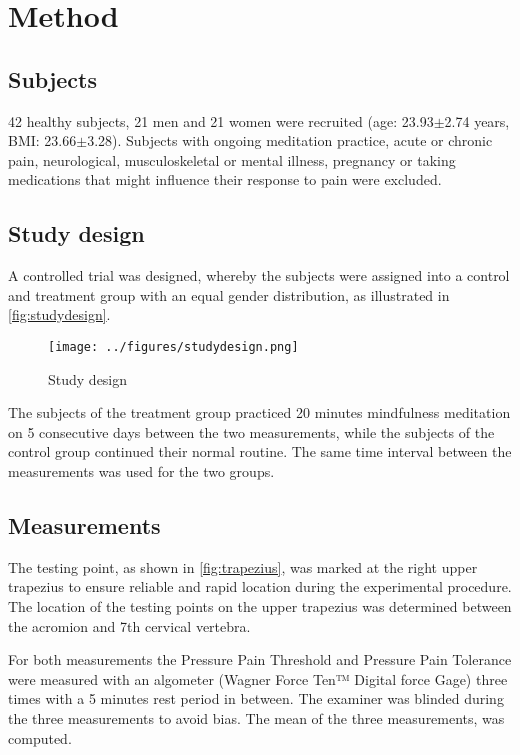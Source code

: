 \section{Method}
\subsection{Subjects}
42 healthy subjects, 21 men and 21 women were recruited (age: 23.93$\pm$2.74 years, BMI: 23.66$\pm$3.28). Subjects with ongoing meditation practice, acute or chronic pain, neurological, musculoskeletal or mental illness, pregnancy or taking medications that might influence their response to pain were excluded.

\subsection{Study design}
A controlled trial was designed, whereby the subjects were assigned into a control and treatment group with an equal gender distribution, as illustrated in \autoref{fig:studydesign}.

\begin{figure}[H]
\centering
\texttt{[image: ../figures/studydesign.png]}
\caption{Study design}
\label{fig:studydesign}
\end{figure} 

\noindent 
The subjects of the treatment group practiced 20 minutes mindfulness meditation on 5 consecutive days between the two measurements, while the subjects of the control group continued their normal routine. The same time interval between the measurements was used for the two groups.

\subsection{Measurements}%
The testing point, as shown in \autoref{fig:trapezius}, was marked at the right upper trapezius to ensure reliable and rapid location during the experimental procedure. The location of the testing points on the upper trapezius was determined between the acromion and 7th cervical vertebra. 

For both measurements the Pressure Pain Threshold and Pressure Pain Tolerance were measured with an algometer (Wagner Force Ten™ Digital force Gage) three times with a 5 minutes rest period in between. The examiner was blinded during the three measurements to avoid bias. The mean of the three measurements, was computed. 

